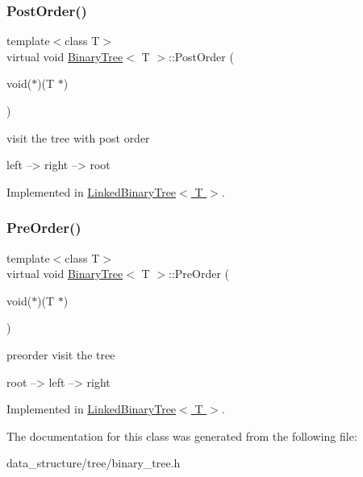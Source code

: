 \subsubsection{\texorpdfstring{Post\+Order()}{PostOrder()}}
{\footnotesize\ttfamily template$<$class T$>$ \\
virtual void \hyperlink{classBinaryTree}{Binary\+Tree}$<$ T $>$\+::Post\+Order (\begin{DoxyParamCaption}\item[{void($\ast$)(T $\ast$)}]{ }\end{DoxyParamCaption})\hspace{0.3cm}{\ttfamily [pure virtual]}}

visit the tree with post order \begin{DoxyVerb}left --> right --> root
\end{DoxyVerb}
 

Implemented in \hyperlink{classLinkedBinaryTree_ad8a0144cc092a677eb2b3189059dd19f}{Linked\+Binary\+Tree$<$ T $>$}.

\mbox{\label{classBinaryTree_a34fabb6ce2424c3ef1e038e148e273c5}} 
\subsubsection{\texorpdfstring{Pre\+Order()}{PreOrder()}}
{\footnotesize\ttfamily template$<$class T$>$ \\
virtual void \hyperlink{classBinaryTree}{Binary\+Tree}$<$ T $>$\+::Pre\+Order (\begin{DoxyParamCaption}\item[{void($\ast$)(T $\ast$)}]{ }\end{DoxyParamCaption})\hspace{0.3cm}{\ttfamily [pure virtual]}}

preorder visit the tree \begin{DoxyVerb}root --> left --> right
\end{DoxyVerb}
 

Implemented in \hyperlink{classLinkedBinaryTree_ab6a897c3961294d56cd83790aaa3ff9c}{Linked\+Binary\+Tree$<$ T $>$}.



The documentation for this class was generated from the following file\+:\begin{DoxyCompactItemize}
\item 
data\+\_\+structure/tree/binary\+\_\+tree.\+h\end{DoxyCompactItemize}
